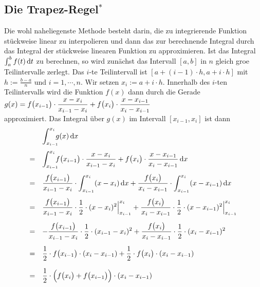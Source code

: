 \subsection{Die Trapez-Regel$^*$}
Die wohl naheliegenste Methode besteht darin, die zu integrierende Funktion st\"uckweise
linear zu interpolieren und dann das zur berechnende Integral durch das Integral der
st\"uckweise linearen Funktion zu approximieren.
Ist das Integral $\int_a^b f(t)\,\textrm{d} t$ zu berechnen, so wird zun\"achst das Intervall $[a,b]$
in $n$ gleich gro\3e Teilintervalle zerlegt.  Das $i$-te Teilintervall ist $[a+(i-1)\cdot h,
a+i\cdot h]$ mit $h := \frac{b-a}{n}$ und $i=1,\cdots,n$.
Wir setzen $x_i := a+i\cdot h$.
Innerhalb des $i$-ten Teilintervalls wird die Funktion $f(x)$ dann durch die Gerade 
\\[0.2cm]
\hspace*{1.3cm}
$\displaystyle g(x) = f\bigl(x_{i-1}\bigr)\cdot \frac{x - x_i}{x_{i-1} - x_i} + f\bigl(x_{i}\bigr)\cdot \frac{x - x_{i-1}}{x_{i} - x_{i-1}}$
\\[0.2cm]
approximiert.  Das Integral \"uber $g(x)$ im Intervall $[x_{i-1}, x_i]$ ist dann
$$
\begin{array}[t]{cl}
  &  \dint{x_{i-1}}{x_i} g(x)\, \dr x \\[0.5cm]
= &  \dint{x_{i-1}}{x_i} f\bigl(x_{i-1}\bigr)\cdot \frac{x - x_i}{x_{i-1} - x_i} + f\bigl(x_{i}\bigr)\cdot \frac{x - x_{i-1}}{x_{i} - x_{i-1}}\,\dr x \\[0.5cm]
= &  \ds\frac{f\bigl(x_{i-1}\bigr)}{x_{i-1} - x_i} \cdot  \int_{x_{i-1}}^{x_i} (x - x_i)\,\dr x +
                  \frac{f\bigl(x_{i}\bigr)}{x_{i} - x_{i-1}} \cdot  \int_{x_{i-1}}^{x_i} (x - x_{i-1})\,\dr x \\[0.5cm]
= &  \ds\frac{f\bigl(x_{i-1}\bigr)}{x_{i-1} - x_i} \cdot \frac{1}{2} \cdot (x - x_i)^2 \Big|_{x_{i-1}}^{x_i}  +
                  \frac{f\bigl(x_{i}\bigr)}{x_{i} - x_{i-1}} \cdot \frac{1}{2} \cdot (x - x_{i-1})^2 \Big|_{x_{i-1}}^{x_i} \\[0.5cm]
= &  \ds-\frac{f\bigl(x_{i-1}\bigr)}{x_{i-1} - x_i} \cdot \frac{1}{2} \cdot (x_{i-1} - x_i)^2   +
                   \frac{f\bigl(x_{i}\bigr)}{x_{i} - x_{i-1}} \cdot \frac{1}{2} \cdot (x_i - x_{i-1})^2  \\[0.5cm]
= &  \ds \frac{1}{2} \cdot f\bigl(x_{i-1}\bigr) \cdot (x_i - x_{i-1}) +
     \frac{1}{2} \cdot f\bigl(x_{i}\bigr)   \cdot (x_i - x_{i-1})    \\[0.5cm]
= &  \ds \frac{1}{2} \cdot  \Bigl(f\bigl(x_{i}\bigr) + f\bigl(x_{i-1}\bigr)\Bigr) \cdot  (x_{i} - x_{i-1}) 
\end{array}
$$
